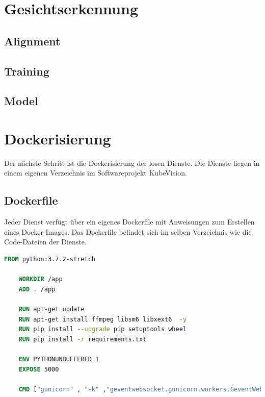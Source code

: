 \section{Gesichtserkennung}
\subsection{Alignment}
\subsection{Training}
\subsection{Model}

\section{Dockerisierung}

Der nächste Schritt ist die Dockerisierung der losen Dienste.
Die Dienste liegen in einem eigenen Verzeichnis im Softwareprojekt KubeVision.

\subsection{Dockerfile}

Jeder Dienst verfügt über ein eigenes Dockerfile mit Anweisungen zum Erstellen eines Docker-Images.
Das Dockerfile befindet sich im selben Verzeichnis wie die Code-Dateien der Dienste.

\begin{lstlisting}[caption={Dockerfile},captionpos=b ,label={lst:Dockerfile},language=Dockerfile]
    FROM python:3.7.2-stretch
    
    WORKDIR /app
    ADD . /app
    
    RUN apt-get update
    RUN apt-get install ffmpeg libsm6 libxext6  -y
    RUN pip install --upgrade pip setuptools wheel
    RUN pip install -r requirements.txt
    
    ENV PYTHONUNBUFFERED 1
    EXPOSE 5000
    
    CMD ["gunicorn" , "-k" ,"geventwebsocket.gunicorn.workers.GeventWebSocketWorker", "-w", "3" , "--bind" , ":5000" , "run:app"]
    \end{lstlisting}

